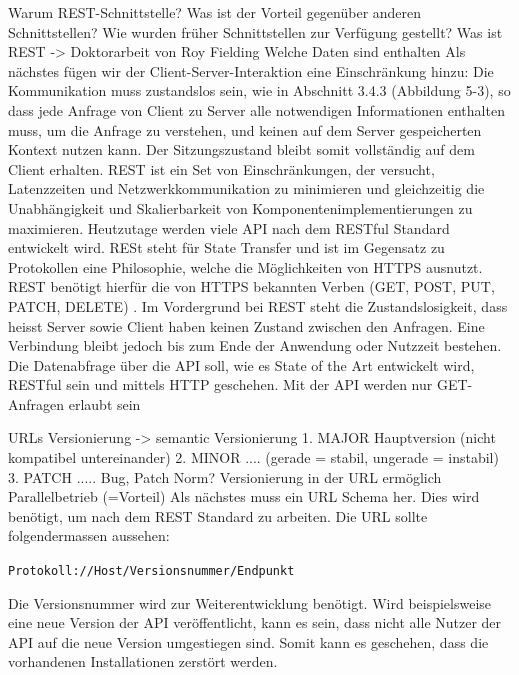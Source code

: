 Warum REST-Schnittstelle? Was ist der Vorteil gegenüber anderen Schnittstellen? Wie wurden früher Schnittstellen zur Verfügung gestellt?
Was ist REST -> Doktorarbeit von Roy Fielding
Welche Daten sind enthalten
Als nächstes fügen wir der Client-Server-Interaktion eine Einschränkung hinzu: Die Kommunikation muss zustandslos sein, wie in Abschnitt 3.4.3 (Abbildung 5-3), so dass jede Anfrage von Client zu Server alle notwendigen Informationen enthalten muss, um die Anfrage zu verstehen, und keinen auf dem Server gespeicherten Kontext nutzen kann. Der Sitzungszustand bleibt somit vollständig auf dem Client erhalten.
REST ist ein Set von Einschränkungen, der versucht, Latenzzeiten und Netzwerkkommunikation zu minimieren und gleichzeitig die Unabhängigkeit und Skalierbarkeit von Komponentenimplementierungen zu maximieren.
Heutzutage werden viele API nach dem RESTful Standard entwickelt wird. RESt steht für State Transfer und ist im Gegensatz zu Protokollen eine Philosophie, welche die Möglichkeiten von HTTPS ausnutzt. REST benötigt hierfür die von HTTPS bekannten Verben (GET, POST, PUT, PATCH, DELETE) \cite{LornaJaneMitchell2013oreilly}. Im Vordergrund bei REST steht die Zustandslosigkeit, dass heisst Server sowie Client haben keinen Zustand zwischen den Anfragen. Eine Verbindung bleibt jedoch bis zum Ende der Anwendung oder Nutzzeit bestehen.
Die Datenabfrage über die API soll, wie es State of the Art entwickelt wird, RESTful sein und mittels HTTP geschehen. Mit der API werden nur GET-Anfragen erlaubt sein

\noindent
{}\newline

URLs
Versionierung -> semantic Versionierung
1. MAJOR Hauptversion (nicht kompatibel untereinander)
2. MINOR .... (gerade = stabil, ungerade = instabil)
3. PATCH ..... Bug, Patch
Norm?
Versionierung in der URL ermöglich Parallelbetrieb (=Vorteil)
Als nächstes muss ein URL Schema her. Dies wird benötigt, um nach dem REST Standard zu arbeiten. Die URL sollte folgendermassen aussehen:


\texttt{Protokoll://Host/Versionsnummer/Endpunkt}

Die Versionsnummer wird zur Weiterentwicklung benötigt. Wird beispielsweise eine neue Version der API veröffentlicht, kann es sein, dass nicht alle Nutzer der API auf die neue Version umgestiegen sind. Somit kann es geschehen, dass die vorhandenen Installationen zerstört werden.








